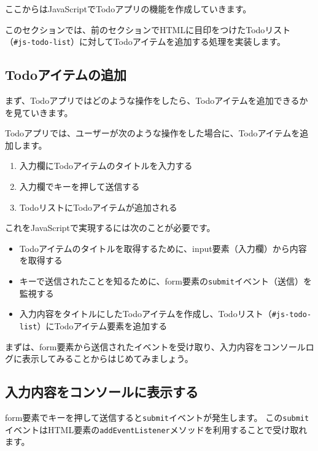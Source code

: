 ここからはJavaScriptでTodoアプリの機能を作成していきます。

このセクションでは、前のセクションでHTMLに目印をつけたTodoリスト（\texttt{\#js-todo-list}）に対してTodoアイテムを追加する処理を実装します。

\hypertarget{add-todo-item}{%
\subsection{Todoアイテムの追加}\label{add-todo-item}}

まず、Todoアプリではどのような操作をしたら、Todoアイテムを追加できるかを見ていきます。

Todoアプリでは、ユーザーが次のような操作をした場合に、Todoアイテムを追加します。

\begin{enumerate}
\def\labelenumi{\arabic{enumi}.}
\item
  入力欄にTodoアイテムのタイトルを入力する
\item
  入力欄でキーを押して送信する
\item
  TodoリストにTodoアイテムが追加される
\end{enumerate}

これをJavaScriptで実現するには次のことが必要です。

\begin{itemize}
\item
  Todoアイテムのタイトルを取得するために、input要素（入力欄）から内容を取得する
\item
  キーで送信されたことを知るために、form要素の\texttt{submit}イベント（送信）を監視する
\item
  入力内容をタイトルにしたTodoアイテムを作成し、Todoリスト（\texttt{\#js-todo-list}）にTodoアイテム要素を追加する
\end{itemize}

まずは、form要素から送信されたイベントを受け取り、入力内容をコンソールログに表示してみることからはじめてみましょう。

\hypertarget{input-to-console}{%
\subsection{入力内容をコンソールに表示する}\label{input-to-console}}

form要素でキーを押して送信すると\texttt{submit}イベントが発生します。
この\texttt{submit}イベントはHTML要素の\texttt{addEventListener}メソッドを利用することで受け取れます。

